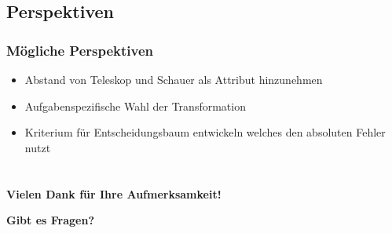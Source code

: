\documentclass[aspectratio=1610, professionalfonts, 9pt]{beamer}
\begin{document}
  \subsection{Perspektiven}

  \begin{frame}
    \frametitle{Mögliche Perspektiven}
    \begin{itemize}
      \item Abstand von Teleskop und Schauer als Attribut hinzunehmen
      \item Aufgabenspezifische Wahl der Transformation
      \item Kriterium für Entscheidungsbaum entwickeln welches den absoluten Fehler nutzt
    \end{itemize}
  \end{frame}

  \section{}

  \begin{frame}
    \centering
    \huge{\textbf{Vielen Dank für Ihre Aufmerksamkeit!}}

    \vspace{2cm}

    \large{\textbf{Gibt es Fragen?}}
  \end{frame}
  \begin{frame}[allowframebreaks]
    \printbibliography
  \end{frame}
\end{document}
